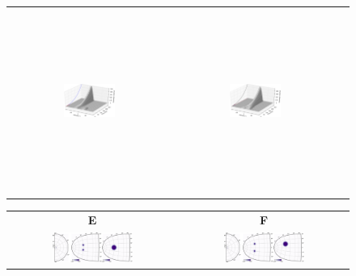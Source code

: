 \begin{figure}
\begin{center}
\begin{tabular}[t]{ccc}
      \includegraphics[width=0.33\textwidth, height=6cm]{figures/ch3_9_distractor-effect-2} &
      \includegraphics[width=0.33\textwidth, height=6cm]{figures/ch3_9_distractor-effect-3} \\
    \end{tabular}
    \begin{tabular}[t]{cc}
      {\textsf {\textbf E}} &
      {\textsf {\textbf F}} \\     
      \includegraphics[width=0.5\textwidth]{figures/ch3_9_stimulus-3} &
      \includegraphics[width=0.5\textwidth]{figures/ch3_9_stimulus-4} \\
    \end{tabular}

  \end{center}


\end{figure}
